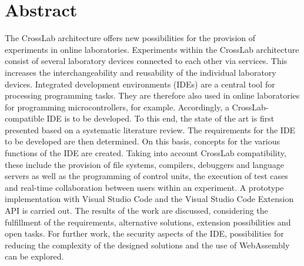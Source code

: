 \section*{Abstract}
The CrossLab architecture offers new possibilities for the provision of experiments in online laboratories. Experiments within the CrossLab architecture consist of several laboratory devices connected to each other via services. This increases the interchangeability and reusability of the individual laboratory devices. Integrated development environments (IDEs) are a central tool for processing programming tasks. They are therefore also used in online laboratories for programming microcontrollers, for example. Accordingly, a CrossLab-compatible IDE is to be developed. To this end, the state of the art is first presented based on a systematic literature review. The requirements for the IDE to be developed are then determined. On this basis, concepts for the various functions of the IDE are created. Taking into account CrossLab compatibility, these include the provision of file systems, compilers, debuggers and language servers as well as the programming of control units, the execution of test cases and real-time collaboration between users within an experiment. A prototype implementation with Visual Studio Code and the Visual Studio Code Extension API is carried out. The results of the work are discussed, considering the fulfillment of the requirements, alternative solutions, extension possibilities and open tasks. For further work, the security aspects of the IDE, possibilities for reducing the complexity of the designed solutions and the use of WebAssembly can be explored.